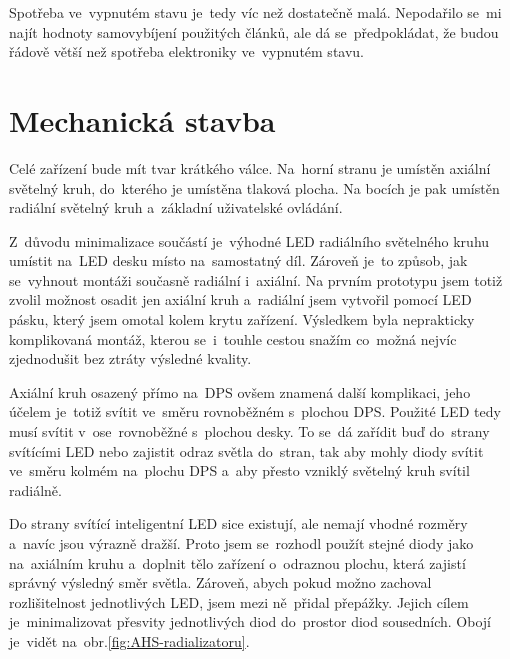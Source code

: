 Spotřeba ve~vypnutém stavu je~tedy víc než dostatečně malá.
Nepodařilo se~mi najít hodnoty samovybíjení použitých článků, ale dá se~předpokládat, že budou řádově větší než spotřeba elektroniky ve~vypnutém stavu.

\section{Mechanická stavba}
Celé zařízení bude mít tvar krátkého válce.
Na~horní stranu je umístěn axiální světelný kruh, do~kterého je umístěna tlaková plocha.
Na bocích je pak umístěn radiální světelný kruh a~základní uživatelské ovládání.

Z~důvodu minimalizace součástí je~výhodné LED radiálního světelného kruhu umístit na~LED desku místo na~samostatný díl.
Zároveň je~to způsob, jak se~vyhnout montáži současně radiální i~axiální.
Na prvním prototypu jsem totiž zvolil možnost osadit jen axiální kruh a~radiální jsem vytvořil pomocí LED pásku, který jsem omotal kolem krytu zařízení.
Výsledkem byla neprakticky komplikovaná montáž, kterou se~i~touhle cestou snažím co~možná nejvíc zjednodušit bez ztráty výsledné kvality.

Axiální kruh osazený přímo na~DPS ovšem znamená další komplikaci, jeho účelem je~totiž svítit ve~směru rovnoběžném s~plochou DPS.
Použité LED tedy musí svítit v~ose~rovnoběžné s~plochou desky.
To se~dá zařídit buď do~strany svítícími LED nebo zajistit odraz světla do~stran, tak aby mohly diody svítit ve~směru kolmém na~plochu DPS a~aby přesto vzniklý světelný kruh svítil radiálně.

Do strany svítící inteligentní LED sice existují, ale nemají vhodné rozměry a~navíc jsou výrazně dražší.
Proto jsem se~rozhodl použít stejné diody jako na~axiálním kruhu a~doplnit tělo zařízení o~odraznou plochu, která zajistí správný výsledný směr světla.
Zároveň, abych pokud možno zachoval rozlišitelnost jednotlivých LED, jsem mezi ně~přidal přepážky.
Jejich cílem je~minimalizovat přesvity jednotlivých diod do~prostor diod sousedních.
Obojí je~vidět na~obr.\ref{fig:AHS-radializatoru}.

